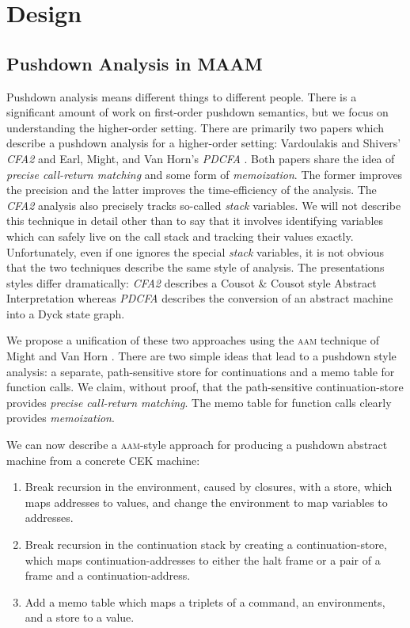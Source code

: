 \documentclass[10pt,letter,english]{article}
\newcommand{\aam}[0]{\textsc{aam}}
\begin{document}
\section{Design}
\subsection{Pushdown Analysis in MAAM}

Pushdown analysis means different things to different people. There is a
significant amount of work on first-order pushdown semantics, but we focus on
understanding the higher-order setting. There are primarily two papers which
describe a pushdown analysis for a higher-order setting: Vardoulakis and
Shivers' \emph{CFA2} \cite{cfa2} and Earl, Might, and Van Horn's \emph{PDCFA}
\cite{pdcfa}. Both papers share the idea of \emph{precise call-return matching}
and some form of \emph{memoization}. The former improves the precision and the
latter improves the time-efficiency of the analysis. The \emph{CFA2} analysis
also precisely tracks so-called \emph{stack} variables. We will not describe
this technique in detail other than to say that it involves identifying
variables which can safely live on the call stack and tracking their values
exactly. Unfortunately, even if one ignores the special \emph{stack} variables,
it is not obvious that the two techniques describe the same style of
analysis. The presentations styles differ dramatically: \emph{CFA2} describes a
Cousot \& Cousot style Abstract Interpretation whereas \emph{PDCFA} describes
the conversion of an abstract machine into a Dyck state graph.

We propose a unification of these two approaches using the \aam{} technique of
Might and Van Horn \cite{aam}. There are two simple ideas that lead to a
pushdown style analysis: a separate, path-sensitive store for continuations and
a memo table for function calls. We claim, without proof, that the
path-sensitive continuation-store provides \emph{precise call-return matching}.
The memo table for function calls clearly provides \emph{memoization}.

We can now describe a \aam{}-style approach for producing a pushdown abstract
machine from a concrete CEK machine:
\begin{enumerate}
\item Break recursion in the environment, caused by closures, with a store,
  which maps addresses to values, and change the environment to map variables to
  addresses.
\item Break recursion in the continuation stack by creating a
  continuation-store, which maps continuation-addresses to either the halt frame
  or a pair of a frame and a continuation-address.
\item Add a memo table which maps a triplets of a command, an environments, and
  a store to a value.
\end{enumerate}
\end{document}
